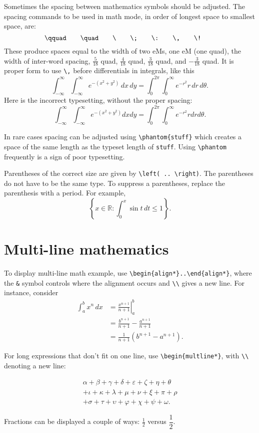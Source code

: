 \documentclass[11pt]{article}
\begin{document}
Sometimes the spacing between mathematics symbols should be adjusted.  The
spacing commands to be used in math mode, in order of longest space to smallest
space, are:
\[
  \verb~\qquad~ \qquad
  \verb~\quad~  \qquad
  \verb~\~      \qquad
  \verb~\;~     \qquad
  \verb~\:~     \qquad
  \verb~\,~     \qquad
  \verb~\!~     \qquad
\]
These produce spaces equal to the width of two eMs, one eM (one quad), the
width of inter-word spacing, \(\frac{5}{18}\) quad, \(\frac{4}{18}\) quad,
\(\frac{3}{18}\) quad, and \(-\frac{3}{18}\) quad.  It is proper form to use
\verb~\,~ before differentials in integrals, like this
\[
  \int_{-\infty}^\infty \int_{-\infty}^\infty e^{-(x^2+y^2)} \, dx \, dy
  = \int_0^{2 \pi} \int_0^\infty e^{-r^2} r \, dr \, d\theta.
\]
Here is the incorrect typesetting, without the proper spacing:
\[
  \int_{-\infty}^\infty \int_{-\infty}^\infty e^{-(x^2+y^2)}  dx  dy
  = \int_0^{2 \pi} \int_0^\infty e^{-r^2} r dr d\theta.
\]

In rare cases spacing can be adjusted using \verb~\phantom{stuff}~ which
creates a space of the same length as the typeset length of \verb~stuff~.
Using \verb~\phantom~ frequently is a sign of poor typesetting.

Parentheses of the correct size are given by \verb~\left( .. \right)~.  The
parentheses do not have to be the same type.  To suppress a parentheses,
replace the parenthesis with a period.  For example,
\[ \left \{ x \in \mathbb{R} : \int_0^x \sin t \, dt \leq 1 \right \}. \]

\section{Multi-line mathematics}

To display multi-line math example, use \verb~\begin{align*}..\end{align*}~,
where the \verb~&~ symbol controls where the alignment occurs and \verb~\\~
gives a new line.  For instance, consider
\begin{align}
  \int_a^b x^n \, dx
 & = \left. \frac{x^{n+1}}{n+1} \right|_a^b   \\
 & = \frac{b^{n+1}}{n+1} -\frac{a^{n+1}}{n+1} \nonumber \\
 & = \frac{1}{n+1}(b^{n+1}-a^{n+1}).
\end{align}

For long expressions that don't fit on one line, use
\verb~\begin{multline*}~, with \verb~\\~ denoting a new line:

\begin{multline*}
  \alpha + \beta + \gamma + \delta + \varepsilon + \zeta + \eta + \theta   \\
  + \iota + \kappa + \lambda + \mu + \nu + \xi + \pi + \rho \\
  + \sigma + \tau + \upsilon + \varphi + \chi + \psi + \omega.
\end{multline*}

Fractions can be displayed a couple of ways: \(\frac{1}{2}\) versus \(\dfrac{1}{2}\).
\end{document}
